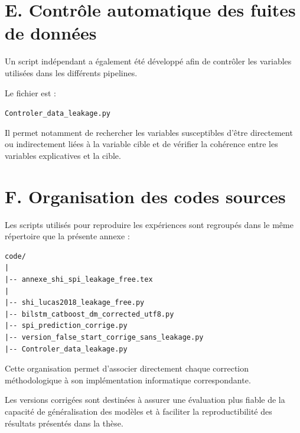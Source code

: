 \section*{E. Contrôle automatique des fuites de données}

Un script indépendant a également été développé afin de contrôler les
variables utilisées dans les différents pipelines.

Le fichier est :

\begin{center}
\texttt{Controler\_data\_leakage.py}
\end{center}

Il permet notamment de rechercher les variables susceptibles d'être
directement ou indirectement liées à la variable cible et de vérifier la
cohérence entre les variables explicatives et la cible.




\section*{F. Organisation des codes sources}

Les scripts utilisés pour reproduire les expériences sont regroupés dans le
même répertoire que la présente annexe :

\begin{verbatim}
code/
|
|-- annexe_shi_spi_leakage_free.tex
|
|-- shi_lucas2018_leakage_free.py
|-- bilstm_catboost_dm_corrected_utf8.py
|-- spi_prediction_corrige.py
|-- version_false_start_corrige_sans_leakage.py
|-- Controler_data_leakage.py
\end{verbatim}

Cette organisation permet d'associer directement chaque correction
méthodologique à son implémentation informatique correspondante.

Les versions corrigées sont destinées à assurer une évaluation plus fiable
de la capacité de généralisation des modèles et à faciliter la reproductibilité
des résultats présentés dans la thèse.
